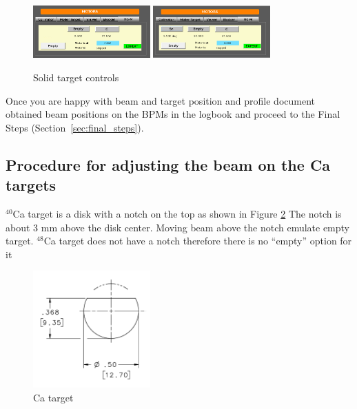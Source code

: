 \begin{figure}[htb!]
\centering
\includegraphics[width=0.4\textwidth]{1foil.PNG}
\includegraphics[width=0.4\textwidth]{2foil.PNG}
\caption{Solid target controls}
\label{fig:foils}
\end{figure}

Once you are happy with beam and target position and profile document obtained beam positions on the BPMs in the logbook and proceed to the Final Steps (Section~\ref{sec:final_steps}).

\subsection{Procedure for adjusting the beam on the Ca targets} \label{sec:Ca}
$^{40}$Ca target is a disk with a notch on the top as shown in Figure \ref{fig:Ca}
The notch is about 3 mm above the disk center. Moving beam above the notch emulate empty target.
$^{48}$Ca target does not have a notch therefore there is no ``empty'' option for it

\begin{figure}[htb!]
\centering
\includegraphics[width=0.4\textwidth]{Ca_target.png}
\caption{Ca target}
\label{fig:Ca}
\end{figure}

